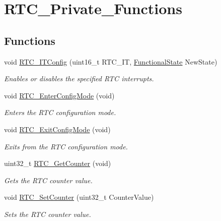 \hypertarget{group___r_t_c___private___functions}{}\section{R\+T\+C\+\_\+\+Private\+\_\+\+Functions}
\label{group___r_t_c___private___functions}
\subsection*{Functions}
\begin{DoxyCompactItemize}
\item 
void \mbox{\hyperlink{group___r_t_c___private___functions_ga175dfe88866234730c1ec40d2221c4f4}{R\+T\+C\+\_\+\+I\+T\+Config}} (uint16\+\_\+t R\+T\+C\+\_\+\+IT, \mbox{\hyperlink{group___exported__types_gac9a7e9a35d2513ec15c3b537aaa4fba1}{Functional\+State}} New\+State)
\begin{DoxyCompactList}\small\item\em Enables or disables the specified R\+TC interrupts. \end{DoxyCompactList}\item 
void \mbox{\hyperlink{group___r_t_c___private___functions_ga23612d9da2fe057a0cd72c684e5b438a}{R\+T\+C\+\_\+\+Enter\+Config\+Mode}} (void)
\begin{DoxyCompactList}\small\item\em Enters the R\+TC configuration mode. \end{DoxyCompactList}\item 
void \mbox{\hyperlink{group___r_t_c___private___functions_ga7585aa6e2dbb497173b2fd03bac0d304}{R\+T\+C\+\_\+\+Exit\+Config\+Mode}} (void)
\begin{DoxyCompactList}\small\item\em Exits from the R\+TC configuration mode. \end{DoxyCompactList}\item 
uint32\+\_\+t \mbox{\hyperlink{group___r_t_c___private___functions_ga6edb19a0ad8414a40610341121c5ea6c}{R\+T\+C\+\_\+\+Get\+Counter}} (void)
\begin{DoxyCompactList}\small\item\em Gets the R\+TC counter value. \end{DoxyCompactList}\item 
void \mbox{\hyperlink{group___r_t_c___private___functions_gafa81ec17158de1d1a7740eca81b9fb65}{R\+T\+C\+\_\+\+Set\+Counter}} (uint32\+\_\+t Counter\+Value)
\begin{DoxyCompactList}\small\item\em Sets the R\+TC counter value. \end{DoxyCompactList}\item 

\end{DoxyCompactItemize}
